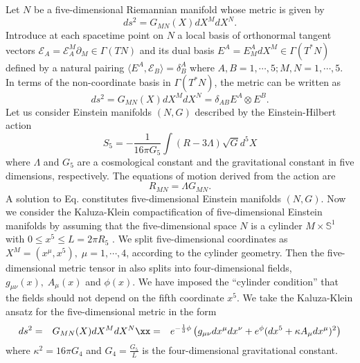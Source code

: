 \documentclass[12pt,epsf]{article}
\begin{document}
Let $N$ be a five-dimensional Riemannian manifold whose metric is given by
\begin{equation}\label{5-metric}
  ds^2 = G_{MN} (X) dX^M dX^N.
\end{equation}
Introduce at each spacetime point on $N$ a local basis of orthonormal tangent vectors
$\mathcal{E}_A = \mathcal{E}_A^M \partial_M \in \Gamma(TN)$ and its dual basis $E^A = E^A_M dX^M \in \Gamma(T^*N)$
defined by a natural pairing $\langle E^A, \mathcal{E}_B \rangle = \delta^A_B$ where $A, B = 1, \cdots, 5; M, N = 1, \cdots, 5$.
In terms of the non-coordinate basis in $\Gamma(T^*N)$, the metric  can be written as
\begin{equation}\label{5-metric-viel}
  ds^2 = G_{MN} (X) dX^M dX^N = \delta_{AB} E^A \otimes E^B.
\end{equation}
Let us consider Einstein manifolds $(N, G)$ described by the Einstein-Hilbert action
\begin{equation}\label{5-ehaction}
  S_5 = - \frac{1}{16 \pi G_5} \int (R - 3 \Lambda) \sqrt{G} d^5 X
\end{equation}
where $\Lambda$ and $G_5$ are a cosmological constant and the gravitational constant
in five dimensions, respectively. The equations of motion derived from the action  are
\begin{equation}\label{5ein-eq}
  R_{MN} = \Lambda G_{MN}.
\end{equation}
A solution to Eq.  constitutes five-dimensional Einstein manifolds $(N, G)$.
Now we consider the Kaluza-Klein compactification of five-dimensional Einstein manifolds by assuming that
the five-dimensional space $N$ is a cylinder $M \times \mathbb{S}^1$ with $0 \leq x^5 \leq L = 2\pi R_5$ \cite{kk-book}.
We split five-dimensional coordinates as $X^M = (x^\mu, x^5), \; \mu=1, \cdots, 4$, according to the cylinder geometry.
Then the five-dimensional metric tensor in  also splits into four-dimensional fields, $g_{\mu\nu} (x), \; A_\mu (x)$
and $\phi(x)$. We have imposed the “cylinder condition” that the fields should not depend on the fifth coordinate $x^5$.
We take the Kaluza-Klein ansatz for the five-dimensional metric in the form
\begin{eqnarray}\label{kk-metric}
  ds^2 &=& G_{MN} (X) dX^M dX^N \xx
  &=& e^{-\frac{1}{3} \phi} \left( g_{\mu\nu} dx^\mu dx^\nu + e^\phi (dx^5 + \kappa A_\mu dx^\mu)^2 \right)
\end{eqnarray}
where $\kappa^2 = 16 \pi G_4$ and $G_4 = \frac{G_5}{L}$ is the four-dimensional gravitational constant.
\end{document}
